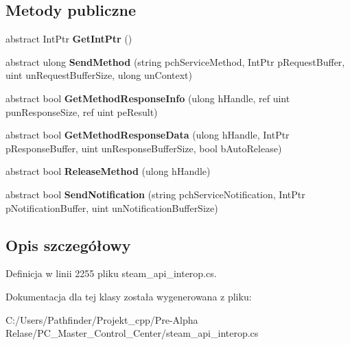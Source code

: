 \subsection*{Metody publiczne}
\begin{DoxyCompactItemize}
\item 
\mbox{\label{class_valve_1_1_steamworks_1_1_i_steam_unified_messages_aefd6531fb502e8e0a9423d02853101f5}} 
abstract Int\+Ptr {\bfseries Get\+Int\+Ptr} ()
\item 
\mbox{\label{class_valve_1_1_steamworks_1_1_i_steam_unified_messages_a347cdc546a7a127f648d3147a0bb39a6}} 
abstract ulong {\bfseries Send\+Method} (string pch\+Service\+Method, Int\+Ptr p\+Request\+Buffer, uint un\+Request\+Buffer\+Size, ulong un\+Context)
\item 
\mbox{\label{class_valve_1_1_steamworks_1_1_i_steam_unified_messages_a26a93d25639a4a4eaee3bcdfd1ee3347}} 
abstract bool {\bfseries Get\+Method\+Response\+Info} (ulong h\+Handle, ref uint pun\+Response\+Size, ref uint pe\+Result)
\item 
\mbox{\label{class_valve_1_1_steamworks_1_1_i_steam_unified_messages_ae4a93be360f2743d0ff9a8838d8f200d}} 
abstract bool {\bfseries Get\+Method\+Response\+Data} (ulong h\+Handle, Int\+Ptr p\+Response\+Buffer, uint un\+Response\+Buffer\+Size, bool b\+Auto\+Release)
\item 
\mbox{\label{class_valve_1_1_steamworks_1_1_i_steam_unified_messages_ab58034295829ea2c2f144abaa5bbc344}} 
abstract bool {\bfseries Release\+Method} (ulong h\+Handle)
\item 
\mbox{\label{class_valve_1_1_steamworks_1_1_i_steam_unified_messages_a983bfdf71cac667e1b0cee3f8e5e0829}} 
abstract bool {\bfseries Send\+Notification} (string pch\+Service\+Notification, Int\+Ptr p\+Notification\+Buffer, uint un\+Notification\+Buffer\+Size)
\end{DoxyCompactItemize}


\subsection{Opis szczegółowy}


Definicja w linii 2255 pliku steam\+\_\+api\+\_\+interop.\+cs.



Dokumentacja dla tej klasy została wygenerowana z pliku\+:\begin{DoxyCompactItemize}
\item 
C\+:/\+Users/\+Pathfinder/\+Projekt\+\_\+cpp/\+Pre-\/\+Alpha Relase/\+P\+C\+\_\+\+Master\+\_\+\+Control\+\_\+\+Center/steam\+\_\+api\+\_\+interop.\+cs\end{DoxyCompactItemize}
